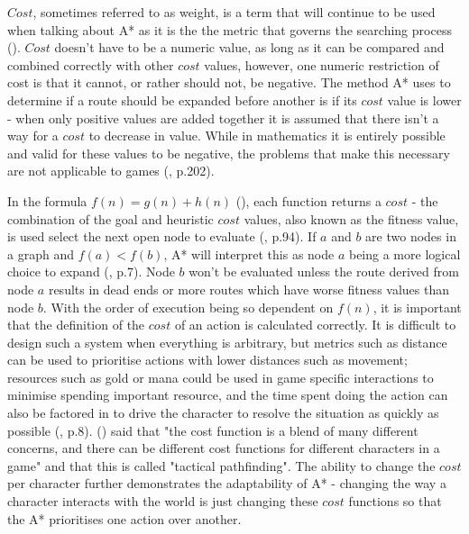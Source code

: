 \documentclass[11pt, a4paper]{article}
\begin{document}
$Cost$, sometimes referred to as weight, is a term that will continue to be used when talking about A* as it is the the metric that governs the searching process (\cite{korf1985depth}). $Cost$ doesn't have to be a numeric value, as long as it can be compared and combined correctly with other $cost$ values, however, one numeric restriction of cost is that it cannot, or rather should not, be negative. The method A* uses to determine if a route should be expanded before another is if its $cost$ value is lower - when only positive values are added together it is assumed that there isn't a way for a $cost$ to decrease in value. While in mathematics it is entirely possible and valid for these values to be negative, the problems that make this necessary are not applicable to games (\cite{millington2019ai}, p.202).

In the formula $f(n) = g(n) + h(n)$ (\cite{hart1968formal}), each function returns a $cost$ - the combination of the goal and heuristic $cost$ values, also known as the fitness value, is used select the next open node to evaluate (\cite{russell2016artificial}, p.94). If $a$ and $b$ are two nodes in a graph and $f(a) < f(b)$, A* will interpret this as node $a$ being a more logical choice to expand (\cite{orkin2003applying}, p.7). Node $b$ won't be evaluated unless the route derived from node $a$ results in dead ends or more routes which have worse fitness values than node $b$. With the order of execution being so dependent on $f(n)$, it is important that the definition of the $cost$ of an action is calculated correctly. It is difficult to design such a system when everything is arbitrary, but metrics such as distance can be used to prioritise actions with lower distances such as movement; resources such as gold or mana could be used in game specific interactions to minimise spending important resource, and the time spent doing the action can also be factored in to drive the character to resolve the situation as quickly as possible (\cite{lester2005pathfinding}, p.8). \citeauthor{millington2019ai} (\citeyear{millington2019ai}) said that "the cost function is a blend of many different concerns, and there can be different cost functions for different characters in a game" and that this is called "tactical pathfinding". The ability to change the $cost$ per character further demonstrates the adaptability of A* - changing the way a character interacts with the world is just changing these $cost$ functions so that the A* prioritises one action over another.
\end{document}
